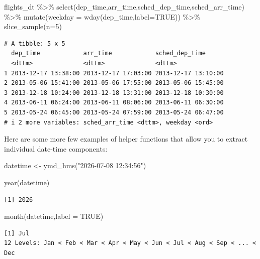 \documentclass[
  letterpaper,
  DIV=11,
  numbers=noendperiod]{scrartcl}
\newenvironment{Shaded}{\begin{snugshade}}{\end{snugshade}}
\newcommand{\AttributeTok}[1]{\textcolor[rgb]{0.40,0.45,0.13}{#1}}
\newcommand{\ConstantTok}[1]{\textcolor[rgb]{0.56,0.35,0.01}{#1}}
\newcommand{\DecValTok}[1]{\textcolor[rgb]{0.68,0.00,0.00}{#1}}
\newcommand{\FunctionTok}[1]{\textcolor[rgb]{0.28,0.35,0.67}{#1}}
\newcommand{\NormalTok}[1]{\textcolor[rgb]{0.00,0.23,0.31}{#1}}
\newcommand{\OtherTok}[1]{\textcolor[rgb]{0.00,0.23,0.31}{#1}}
\newcommand{\SpecialCharTok}[1]{\textcolor[rgb]{0.37,0.37,0.37}{#1}}
\newcommand{\StringTok}[1]{\textcolor[rgb]{0.13,0.47,0.30}{#1}}
\begin{document}
\begin{Shaded}
\begin{Highlighting}[]
\NormalTok{flights\_dt }\SpecialCharTok{\%\textgreater{}\%}
   \FunctionTok{select}\NormalTok{(dep\_time,arr\_time,sched\_dep\_time,sched\_arr\_time) }\SpecialCharTok{\%\textgreater{}\%}
  \FunctionTok{mutate}\NormalTok{(}\AttributeTok{weekday =} \FunctionTok{wday}\NormalTok{(dep\_time,}\AttributeTok{label=}\ConstantTok{TRUE}\NormalTok{)) }\SpecialCharTok{\%\textgreater{}\%}
  \FunctionTok{slice\_sample}\NormalTok{(}\AttributeTok{n=}\DecValTok{5}\NormalTok{)}
\end{Highlighting}
\end{Shaded}

\begin{verbatim}
# A tibble: 5 x 5
  dep_time            arr_time            sched_dep_time     
  <dttm>              <dttm>              <dttm>             
1 2013-12-17 13:38:00 2013-12-17 17:03:00 2013-12-17 13:10:00
2 2013-05-06 15:41:00 2013-05-06 17:55:00 2013-05-06 15:45:00
3 2013-12-18 10:24:00 2013-12-18 13:31:00 2013-12-18 10:30:00
4 2013-06-11 06:24:00 2013-06-11 08:06:00 2013-06-11 06:30:00
5 2013-05-24 06:45:00 2013-05-24 07:59:00 2013-05-24 06:47:00
# i 2 more variables: sched_arr_time <dttm>, weekday <ord>
\end{verbatim}

Here are some more few examples of helper functions that allow you to
extract individual date-time components:

\begin{Shaded}
\begin{Highlighting}[]
\NormalTok{datetime }\OtherTok{\textless{}{-}} \FunctionTok{ymd\_hms}\NormalTok{(}\StringTok{"2026{-}07{-}08 12:34:56"}\NormalTok{)}

\FunctionTok{year}\NormalTok{(datetime)}
\end{Highlighting}
\end{Shaded}

\begin{verbatim}
[1] 2026
\end{verbatim}

\begin{Shaded}
\begin{Highlighting}[]
\FunctionTok{month}\NormalTok{(datetime,}\AttributeTok{label =} \ConstantTok{TRUE}\NormalTok{)}
\end{Highlighting}
\end{Shaded}

\begin{verbatim}
[1] Jul
12 Levels: Jan < Feb < Mar < Apr < May < Jun < Jul < Aug < Sep < ... < Dec
\end{verbatim}
\end{document}
